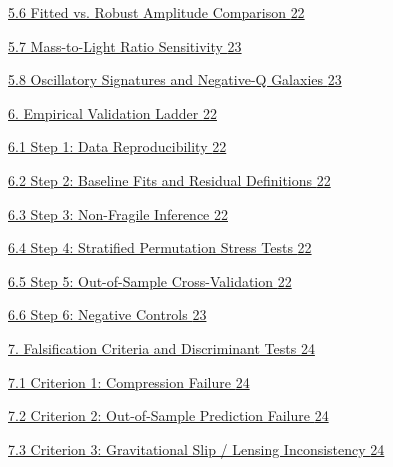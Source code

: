 \documentclass[11pt]{article}
\begin{document}
\hyperref[fitted-vs.-robust-amplitude-comparison]{5.6 Fitted vs. Robust Amplitude Comparison \hyperref[fitted-vs.-robust-amplitude-comparison]{22}}

\hyperref[mass-to-light-ratio-sensitivity]{5.7 Mass-to-Light Ratio Sensitivity \hyperref[mass-to-light-ratio-sensitivity]{23}}

\hyperref[oscillatory-signatures-and-negative-q-galaxies]{5.8 Oscillatory Signatures and Negative-Q Galaxies \hyperref[oscillatory-signatures-and-negative-q-galaxies]{23}}

\hyperref[empirical-validation-ladder]{6. Empirical Validation Ladder \hyperref[empirical-validation-ladder]{22}}

\hyperref[step-1-data-reproducibility]{6.1 Step 1: Data Reproducibility \hyperref[step-1-data-reproducibility]{22}}

\hyperref[step-2-baseline-fits-and-residual-definitions]{6.2 Step 2: Baseline Fits and Residual Definitions \hyperref[step-2-baseline-fits-and-residual-definitions]{22}}

\hyperref[step-3-non-fragile-inference]{6.3 Step 3: Non-Fragile Inference \hyperref[step-3-non-fragile-inference]{22}}

\hyperref[step-4-stratified-permutation-stress-tests]{6.4 Step 4: Stratified Permutation Stress Tests \hyperref[step-4-stratified-permutation-stress-tests]{22}}

\hyperref[step-5-out-of-sample-cross-validation]{6.5 Step 5: Out-of-Sample Cross-Validation \hyperref[step-5-out-of-sample-cross-validation]{22}}

\hyperref[step-6-negative-controls]{6.6 Step 6: Negative Controls \hyperref[step-6-negative-controls]{23}}

\hyperref[falsification-criteria-and-discriminant-tests]{7. Falsification Criteria and Discriminant Tests \hyperref[falsification-criteria-and-discriminant-tests]{24}}

\hyperref[criterion-1-compression-failure]{7.1 Criterion 1: Compression Failure \hyperref[criterion-1-compression-failure]{24}}

\hyperref[criterion-2-out-of-sample-prediction-failure]{7.2 Criterion 2: Out-of-Sample Prediction Failure \hyperref[criterion-2-out-of-sample-prediction-failure]{24}}

\hyperref[criterion-3-gravitational-slip-lensing-inconsistency]{7.3 Criterion 3: Gravitational Slip / Lensing Inconsistency \hyperref[criterion-3-gravitational-slip-lensing-inconsistency]{24}}
\end{document}
